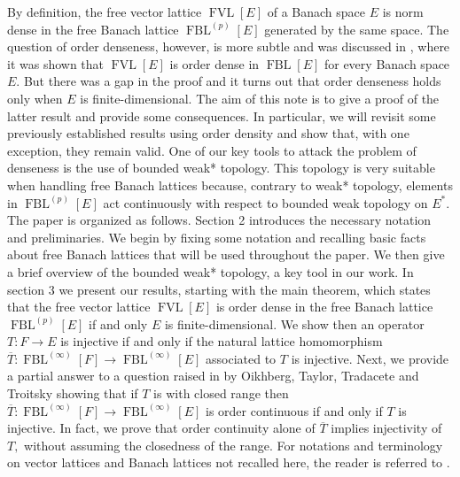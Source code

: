 \documentclass[12pt]{article}%
\begin{document}
By definition, the free vector lattice $\operatorname*{FVL}\left[  E\right]  $
of a Banach space $E$ is norm dense in the free Banach lattice
$\operatorname*{FBL}\nolimits^{(p)}\left[  E\right]  $ generated by the same
space. The question of order denseness, however, is more subtle and was
discussed in \cite{L-925}, where it was shown that $\operatorname*{FVL}\left[
E\right]  $ is order dense in $\operatorname*{FBL}\left[  E\right]  $ for
every Banach space $E.$ But there was a gap in the proof and it turns out that
order denseness holds only when $E$ is finite-dimensional. The aim of this
note is to give a proof of the latter result and provide some consequences. In
particular, we will revisit some previously established results using order
density and show that, with one exception, they remain valid. One of our key
tools to attack the problem of denseness is the use of bounded weak* topology.
This topology is very suitable when handling free Banach lattices because,
contrary to weak* topology, elements in $\operatorname*{FBL}\nolimits^{(p)}%
\left[  E\right]  $ act continuously with respect to bounded weak topology on
$E^{\ast}.$ The paper is organized as follows. Section 2 introduces the
necessary notation and preliminaries. We begin by fixing some notation and
recalling basic facts about free Banach lattices that will be used throughout
the paper. We then give a brief overview of the bounded weak* topology, a key
tool in our work. In section 3 we present our results, starting with the main
theorem, which states that the free vector lattice $\operatorname*{FVL}\left[
E\right]  $ is order dense in the free Banach lattice $\operatorname*{FBL}%
\nolimits^{(p)}\left[  E\right]  $ if and only $E$ is finite-dimensional. We
show then an operator $T:F\longrightarrow E$ is injective if and only if the
natural lattice homomorphism $\overline{T}:\operatorname*{FBL}%
\nolimits^{(\infty)}\left[  F\right]  \longrightarrow\operatorname*{FBL}%
\nolimits^{(\infty)}\left[  E\right]  $ associated to $T$ is injective. Next,
we provide a partial answer to a question raised in \cite{L-925} by Oikhberg,
Taylor, Tradacete and Troitsky showing that if $T$ is with closed range then
$\overline{T}:\operatorname*{FBL}\nolimits^{(\infty)}\left[  F\right]
\longrightarrow\operatorname*{FBL}\nolimits^{(\infty)}\left[  E\right]  $ is
order continuous if and only if $T$ is injective. In fact, we prove that order
continuity alone of $\overline{T}$ implies injectivity of $T,$ without
assuming the closedness of the range. For notations and terminology on vector
lattices and Banach lattices not recalled here, the reader is referred to
\cite{b-240}.
\end{document}
